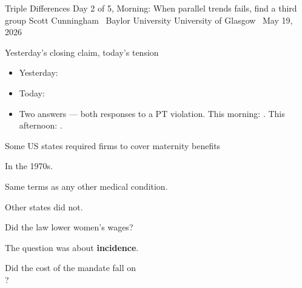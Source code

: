 \documentclass[aspectratio=169,11pt]{beamer}
\begin{document}

\remixtitleframe
  {Triple Differences}
  {Day 2 of 5, Morning: When parallel trends fails, find a third group}
  {Scott Cunningham \textperiodcentered\ Baylor University}
  {University of Glasgow \textperiodcentered\ May 19, 2026}

\begin{frame}{Yesterday's closing claim, today's tension}
\vspace{0.6em}
\vspace{0.6em}
\begin{itemize}
  \item Yesterday: 
  \item Today: 
  \item Two answers --- both responses to a PT violation. This morning: . This afternoon: .
\end{itemize}
\end{frame}

\begin{frame}{Some US states required firms to cover maternity benefits}
\vspace{1.2em}
\begin{center}
\large In the 1970s.
\end{center}
\vspace{0.6em}
\begin{center}
\large Same terms as any other medical condition.
\end{center}
\vspace{0.6em}
\begin{center}
\large Other states did not.
\end{center}
\end{frame}

\begin{frame}{Did the law lower women's wages?}
\vspace{2em}
\begin{center}
\large
The question was about \textbf{incidence}.
\end{center}
\vspace{0.6em}
\begin{center}
\large
Did the cost of the mandate fall on \\[0.2em]
?
\end{center}
\end{frame}
\end{document}
